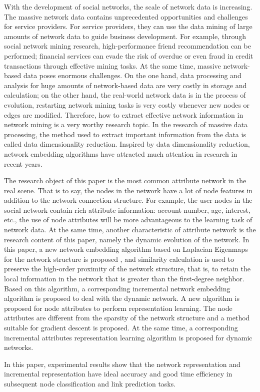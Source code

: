 With the development of social networks, the scale of network data is increasing. The massive network data contains unprecedented opportunities and challenges for service providers. For service providers, they can use the data mining of large amounts of network data to guide business development. For example, through social network mining research, high-performance friend recommendation can be performed; financial services  can evade the risk of overdue or even fraud in credit transactions  through effective mining tasks. At the same time, massive network-based data poses enormous challenges. On the one hand, data processing and analysis for huge amounts of network-based data are very costly in storage and calculation; on the other hand, the real-world network data is in the process of evolution,  restarting network mining tasks is very costly whenever new nodes or edges are modified. Therefore, how to extract effective network information in network mining is a very worthy research topic. In the research of massive data processing, the method used to extract important information from the data is called data dimensionality reduction. Inspired by data dimensionality reduction, network embedding algorithms have attracted much attention in research in recent years.

The research object of this paper is the most common attribute network in the real scene. That is to say, the nodes in the network have a lot of node features in addition to the network connection structure. For example, the user nodes in the social network contain rich attribute information: account number, age, interest,  etc., the use of node attributes will be more advantageous to the learning task of network data. At the same time, another characteristic of attribute network is the research content of this paper, namely the dynamic evolution of the network. In this paper, a new network embedding algorithm based on Laplacian Eigenmaps for the network structure is proposed , and similarity calculation is used to preserve the high-order proximity of the network structure, that is, to retain the local information in the network that is greater than the first-degree neighbor. Based on this algorithm, a corresponding incremental network embedding algorithm is proposed to deal with the dynamic network. A new algorithm is proposed for node attributes to perform representation learning. The node attributes are different from the sparsity of the network structure and a method suitable for gradient descent is proposed.  At the same time, a corresponding incremental attributes representation learning algorithm is proposed for dynamic networks.

In this paper, experimental results show that the network representation and incremental representation have ideal accuracy and good time efficiency in subsequent node classification and link prediction tasks.

